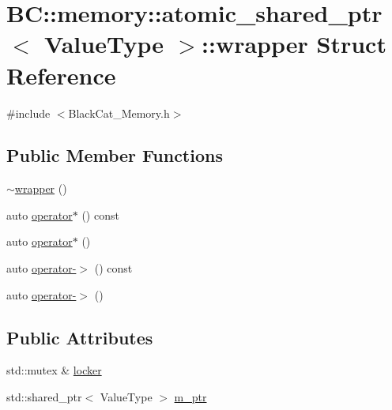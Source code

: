 \hypertarget{structBC_1_1memory_1_1atomic__shared__ptr_1_1wrapper}{}\section{BC\+:\+:memory\+:\+:atomic\+\_\+shared\+\_\+ptr$<$ Value\+Type $>$\+:\+:wrapper Struct Reference}
\label{structBC_1_1memory_1_1atomic__shared__ptr_1_1wrapper}


{\ttfamily \#include $<$Black\+Cat\+\_\+\+Memory.\+h$>$}

\subsection*{Public Member Functions}
\begin{DoxyCompactItemize}
\item 
\hyperlink{structBC_1_1memory_1_1atomic__shared__ptr_1_1wrapper_ac229b7e844197890232bac43324cbe06}{$\sim$wrapper} ()
\item 
auto \hyperlink{structBC_1_1memory_1_1atomic__shared__ptr_1_1wrapper_a2e98b07ac9750c2690b0784e7002f9e9}{operator$\ast$} () const 
\item 
auto \hyperlink{structBC_1_1memory_1_1atomic__shared__ptr_1_1wrapper_a10d2a6d59bfbcff6f0002cdfb54381c2}{operator$\ast$} ()
\item 
auto \hyperlink{structBC_1_1memory_1_1atomic__shared__ptr_1_1wrapper_a970677e7b5c459bcf1fe1bf49bd967fb}{operator-\/$>$} () const 
\item 
auto \hyperlink{structBC_1_1memory_1_1atomic__shared__ptr_1_1wrapper_a1228eb62e25705e03d4917be0d259c68}{operator-\/$>$} ()
\end{DoxyCompactItemize}
\subsection*{Public Attributes}
\begin{DoxyCompactItemize}
\item 
std\+::mutex \& \hyperlink{structBC_1_1memory_1_1atomic__shared__ptr_1_1wrapper_a77d6b201fe173aff6f2f97c1708821f4}{locker}
\item 
std\+::shared\+\_\+ptr$<$ Value\+Type $>$ \hyperlink{structBC_1_1memory_1_1atomic__shared__ptr_1_1wrapper_a8de6277c53a3732d200d36193a9086a0}{m\+\_\+ptr}
\end{DoxyCompactItemize}


